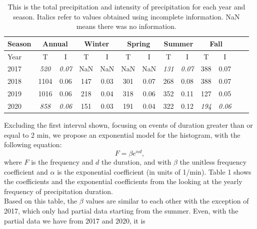 \documentclass[11pt]{report}
\begin{document}
	
\begin{table}[t]
	\begin{center}
		\begin{tabular}{|l|*{11}{c|}r|}
			\hline
			Season    &       \multicolumn{2}{|c|}{Annual}          & \multicolumn{2}{|c|}{Winter}& \multicolumn{2}{|c|}{Spring}  & \multicolumn{2}{|c|}{Summer} &\multicolumn{2}{|c|}{Fall}  \\
			\hline
			Year      & T & I  & T & I  & T & I  & T & I  & T & I \\
			\hline
			2017      & \textit{520}  & \textit{0.07}  & NaN & NaN & NaN & NaN & \textit{131}  & \textit{0.07}  & 388  & 0.07  \\
			2018      & 1104           & 0.06  & 147 & 0.03 & 301 & 0.07 & 268  & 0.08  & 388 & 0.07  \\
			2019      & 1016           & 0.06  & 218  & 0.04 & 318 & 0.06 & 352 & 0.11  & 127 &  0.05 \\
			2020      & \textit{858}           & \textit{0.06}   & 151  & 0.03 & 191  & 0.04 & 322  & 0.12 & \textit{194} & \textit{0.06}\\
			\hline
		\end{tabular}
	\end{center}
	\caption[Summary of total precipitation and intensity]{This is the total precipitation and intensity of precipitation for each year and season. Italics refer to values obtained using incomplete information. NaN means there was no information. }
\end{table}
Excluding the first interval shown, focusing on events of duration
greater than or equal to 2 min, we propose an exponential model for
the histogram, with the following equation:
\begin{equation}
	F = \beta e^{\alpha d},
\end{equation}
where $F$ is the frequency and $d$ the duration, and with $\beta$ the
unitless frequency coefficient and $\alpha$ is the exponential
coefficient (in units of 1/min).
Table 1 shows
the coefficients and the exponential coefficients from the looking at
the yearly frequency of precipitation duration. 
\\ Based on this table, the $\beta$ values are similar to each other with
the exception of 2017, which only had partial data starting from the
summer. Even, with the partial data we have from 2017 and 2020, it is
\end{document}
